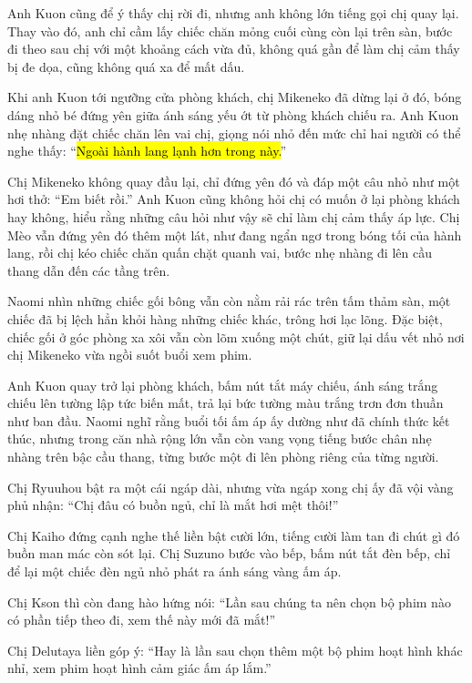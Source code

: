 \documentclass[../main.tex]{subfiles}
\begin{document}
Anh Kuon cũng để ý thấy chị rời đi, nhưng anh không lớn tiếng gọi chị quay lại. Thay vào đó, anh chỉ cầm lấy chiếc chăn mỏng cuối cùng còn lại trên sàn, bước đi theo sau chị với một khoảng cách vừa đủ, không quá gần để làm chị cảm thấy bị đe dọa, cũng không quá xa để mất dấu.

Khi anh Kuon tới ngưỡng cửa phòng khách, chị Mikeneko đã dừng lại ở đó, bóng dáng nhỏ bé đứng yên giữa ánh sáng yếu ớt từ phòng khách chiếu ra. Anh Kuon nhẹ nhàng đặt chiếc chăn lên vai chị, giọng nói nhỏ đến mức chỉ hai người có thể nghe thấy: ``\hl{Ngoài hành lang lạnh hơn trong này.}'' 

Chị Mikeneko không quay đầu lại, chỉ đứng yên đó và đáp một câu nhỏ như một hơi thở: ``Em biết rồi.'' Anh Kuon cũng không hỏi chị có muốn ở lại phòng khách hay không, hiểu rằng những câu hỏi như vậy sẽ chỉ làm chị cảm thấy áp lực. Chị Mèo vẫn đứng yên đó thêm một lát, như đang ngẩn ngơ trong bóng tối của hành lang, rồi chị kéo chiếc chăn quấn chặt quanh vai, bước nhẹ nhàng đi lên cầu thang dẫn đến các tầng trên.

Naomi nhìn những chiếc gối bông vẫn còn nằm rải rác trên tấm thảm sàn, một chiếc đã bị lệch hẳn khỏi hàng những chiếc khác, trông hơi lạc lõng. Đặc biệt, chiếc gối ở góc phòng xa xôi vẫn còn lõm xuống một chút, giữ lại dấu vết nhỏ nơi chị Mikeneko vừa ngồi suốt buổi xem phim. 

Anh Kuon quay trở lại phòng khách, bấm nút tắt máy chiếu, ánh sáng trắng chiếu lên tường lập tức biến mất, trả lại bức tường màu trắng trơn đơn thuần như ban đầu. Naomi nghĩ rằng buổi tối ấm áp ấy dường như đã chính thức kết thúc, nhưng trong căn nhà rộng lớn vẫn còn vang vọng tiếng bước chân nhẹ nhàng trên bậc cầu thang, từng bước một đi lên phòng riêng của từng người.

Chị Ryuuhou bật ra một cái ngáp dài, nhưng vừa ngáp xong chị ấy đã vội vàng phủ nhận: ``Chị đâu có buồn ngủ, chỉ là mắt hơi mệt thôi!'' 

Chị Kaiho đứng cạnh nghe thế liền bật cười lớn, tiếng cười làm tan đi chút gì đó buồn man mác còn sót lại. Chị Suzuno bước vào bếp, bấm nút tắt đèn bếp, chỉ để lại một chiếc đèn ngủ nhỏ phát ra ánh sáng vàng ấm áp. 

Chị Kson thì còn đang hào hứng nói: ``Lần sau chúng ta nên chọn bộ phim nào có phần tiếp theo đi, xem thế này mới đã mắt!'' 

Chị Delutaya liền góp ý: ``Hay là lần sau chọn thêm một bộ phim hoạt hình khác nhỉ, xem phim hoạt hình cảm giác ấm áp lắm.''
\end{document}
